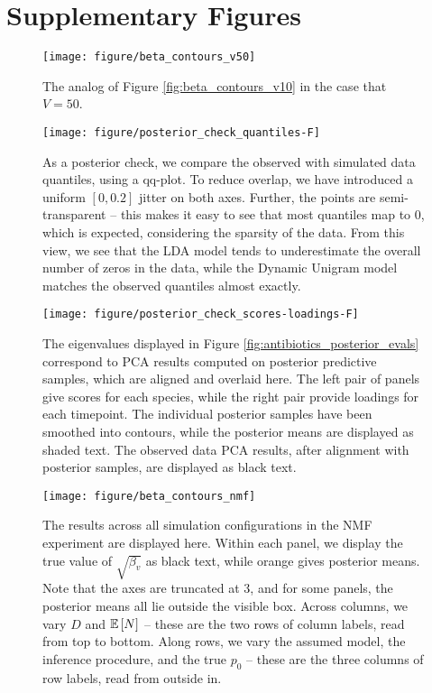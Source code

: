 \documentclass[oupdraft]{bio}
\begin{document}
{\section{Supplementary Figures}

\begin{figure}[!p]
  \centering
  \texttt{[image: figure/beta\_contours\_v50]}
  \caption{The analog of Figure \ref{fig:beta_contours_v10} in the case that $V = 50$. \label{fig:beta_contours_v50}}
\end{figure}

\begin{figure}[!p]
  \centering
  \texttt{[image: figure/posterior\_check\_quantiles-F]}
  \caption{As a posterior check, we compare the observed with simulated
    data quantiles, using a qq-plot. To reduce overlap, we have introduced a 
    uniform $\left[0, 0.2\right]$ jitter on both axes. Further, the points are
    semi-transparent -- this makes it easy to see that most quantiles map to 0,
    which is expected, considering the sparsity of the data. From this view, we
    see that the LDA model tends to underestimate the overall number of zeros in
    the data, while the Dynamic Unigram model matches the observed quantiles
    almost exactly. \label{fig:antibiotics_posterior_quantiles} }
\end{figure}

\begin{figure}[!p]
  \centering
  \texttt{[image: figure/posterior\_check\_scores-loadings-F]}
  \caption{The eigenvalues displayed in Figure
    \ref{fig:antibiotics_posterior_evals} correspond to PCA results computed on
    posterior predictive samples, which are aligned and overlaid here. The left
    pair of panels give scores for each species, while the right pair provide
    loadings for each timepoint. The individual posterior samples have been
    smoothed into contours, while the posterior means are displayed as shaded
    text. The observed data PCA results, after alignment with posterior samples,
    are displayed as black text. \label{fig:antibiotics_posterior_pca} }
\end{figure}

\begin{figure}[!p]
  \centering
  \texttt{[image: figure/beta\_contours\_nmf]}
  \caption{The results across all simulation configurations in the NMF
    experiment are displayed here. Within each panel, we display the true value
    of $\sqrt{\beta_{v}}$ as black text, while orange gives posterior means.
    Note that the axes are truncated at 3, and for some panels, the posterior
    means all lie outside the visible box. Across columns, we vary $D$ and
    $\mathbb{E}\left[{N}\right]$ -- these are the two rows of column labels, read from top to
    bottom. Along rows, we vary the assumed model, the inference procedure, and
    the true $p_{0}$ -- these are the three columns of row labels, read from
    outside in.\label{fig:beta_contours_nmf}}
\end{figure}

}
\end{document}
